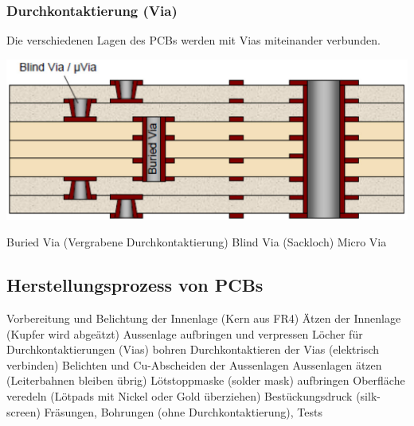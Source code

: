 \subsubsection{Durchkontaktierung (Via)}

Die verschiedenen Lagen des PCBs werden mit Vias miteinander verbunden.

\begin{minipage}[c]{0.48\columnwidth}
    \includegraphics[width=\columnwidth]{images/vias.jpg}
\end{minipage}
\hfill
\begin{minipage}[c]{0.48\columnwidth}
    \begin{outline}
        \1 Buried Via (Vergrabene Durchkontaktierung)
        \1 Blind Via (Sackloch)
        \1 Micro Via
    \end{outline}
\end{minipage}


\subsection{Herstellungsprozess von PCBs}

\begin{outline}
    \1 Vorbereitung und Belichtung der Innenlage (Kern aus FR4)
    \1 Ätzen der Innenlage (Kupfer wird abgeätzt)
    \1 Aussenlage aufbringen und verpressen
    \1 Löcher für Durchkontaktierungen (Vias) bohren
    \1 Durchkontaktieren der Vias (elektrisch verbinden)
    \1 Belichten und Cu-Abscheiden der Aussenlagen
    \1 Aussenlagen ätzen (Leiterbahnen bleiben übrig)
    \1 Lötstoppmaske (solder mask) aufbringen 
    \1 Oberfläche veredeln (Lötpads mit Nickel oder Gold überziehen)
    \1 Bestückungsdruck (silk-screen)
    \1 Fräsungen, Bohrungen (ohne Durchkontaktierung), Tests
\end{outline}


